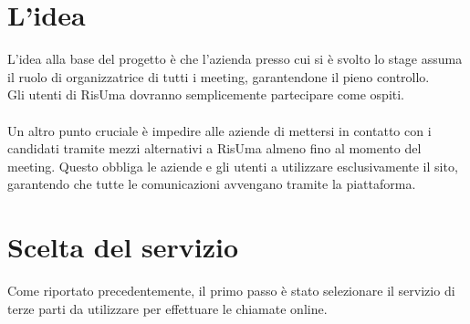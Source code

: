 \section{L'idea}
L'idea alla base del progetto è che l'azienda presso cui si è svolto lo stage assuma il ruolo di organizzatrice 
di tutti i meeting, garantendone il pieno controllo. 
\\
Gli utenti di RisUma dovranno semplicemente partecipare come ospiti.
\\
\\
Un altro punto cruciale è impedire alle aziende di mettersi in contatto con i candidati 
tramite mezzi alternativi a RisUma almeno fino al momento del meeting. Questo obbliga le aziende e gli utenti a 
utilizzare esclusivamente il sito, garantendo che tutte le comunicazioni avvengano tramite la piattaforma.

\section{Scelta del servizio}
Come riportato precedentemente, il primo passo è stato selezionare il servizio di terze parti da utilizzare 
per effettuare le chiamate online.